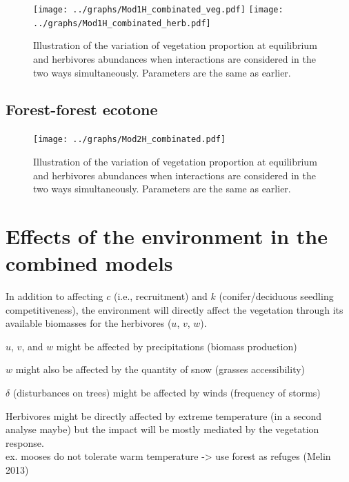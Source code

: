 \begin{figure}[!h]
\centering
\texttt{[image: ../graphs/Mod1H\_combinated\_veg.pdf]}
\texttt{[image: ../graphs/Mod1H\_combinated\_herb.pdf]}
\caption{Illustration of the variation of vegetation proportion at equilibrium and herbivores abundances when interactions are considered in the two ways simultaneously. Parameters are the same as earlier.}
\end{figure}

\newpage
\subsection*{Forest-forest ecotone}

\begin{figure}[!h]
\centering
\texttt{[image: ../graphs/Mod2H\_combinated.pdf]}
\caption{Illustration of the variation of vegetation proportion at equilibrium and herbivores abundances when interactions are considered in the two ways simultaneously. Parameters are the same as earlier.}
\end{figure}




\newpage
\section{Effects of the environment in the combined models}

In addition to affecting $c$ (i.e., recruitment) and $k$ (conifer/deciduous
seedling competitiveness), the environment will directly affect the vegetation
through its available biomasses for the herbivores ($u$, $v$, $w$).

$u$, $v$, and $w$ might be affected by precipitations (biomass production)

\vspace{1em}
\begin{IB}
$w$ might also be affected by the quantity of snow (grasses accessibility)

$\delta$ (disturbances on trees) might be affected by winds (frequency of storms)

Herbivores might be directly affected by extreme temperature (in a second
analyse maybe) but the impact will be mostly mediated by the vegetation
response.\\ 
ex. mooses do not tolerate warm temperature -> use forest as
refuges (Melin 2013)
\end{IB}

